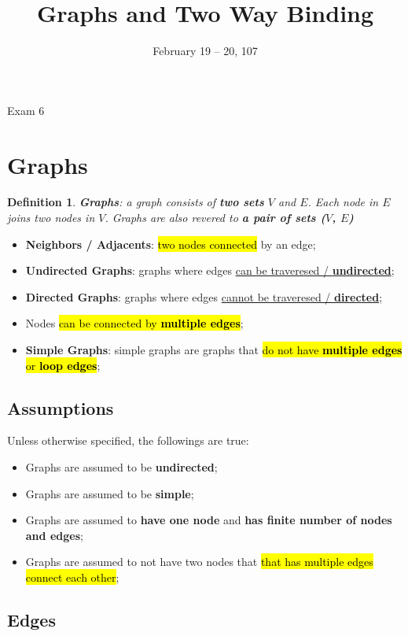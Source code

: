 \documentclass{note}
\date{February 19 -- 20, 107}
\title{Graphs and Two Way Binding}
\newtheorem{definition}{Definition}
\begin{document}
    \begin{note}{Exam 6}

        \section{Graphs}

        \begin{definition}
            \textbf{Graphs}: a graph consists of \textbf{two sets} $ V $ and $ E $. Each node in $ E $ joins two nodes in
            $ V $. Graphs are also revered to \textbf{a pair of sets ($ V $, $ E $)}
        \end{definition}
        \begin{itemize}
            \item \textbf{Neighbors / Adjacents}: \hl{two nodes connected} by an edge;
            \item \textbf{Undirected Graphs}: graphs where edges \ul{can be traveresed / \textbf{undirected}};
            \item \textbf{Directed Graphs}: graphs where edges \ul{cannot be traveresed / \textbf{directed}};
            \item Nodes \hl{can be connected by \textbf{multiple edges}};
            \item \textbf{Simple Graphs}: simple graphs are graphs that \hl{do not have \textbf{multiple edges} or \textbf{loop edges}};
        \end{itemize}

        \subsection{Assumptions}

        Unless otherwise specified, the followings are true:
        \begin{itemize}
            \item Graphs are assumed to be \textbf{undirected};
            \item Graphs are assumed to be \textbf{simple};
            \item Graphs are assumed to \textbf{have one node} and \textbf{has finite number of nodes and edges};
            \item Graphs are assumed to not have two nodes that \hl{that has multiple edges connect each other};
        \end{itemize}

        \subsection{Edges}


\end{note}
\end{document}
